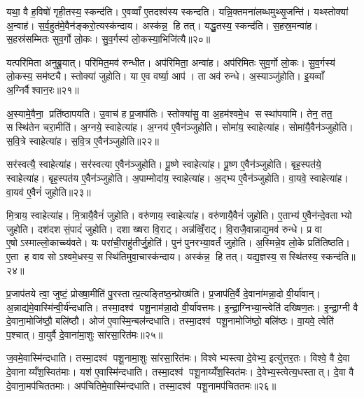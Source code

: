 यथा॒ वै ह॒विषो॑ गृही॒तस्य॒ स्कन्द॑ति। ए॒वव्वाँ ए॒तदश्व॑स्य स्कन्दति। यन्नि॒क्तमना॑लब्धमुथ्सृ॒जन्ति॑। यथ्स्तोक्या॑ अ॒न्वाह॑। स॒र्व॒हुत॑मे॒वैन॑ङ्करो॒त्यस्क॑न्दाय। अस्क॑न्न॒ हि तत्। यद्धु॒तस्य॒ स्कन्द॑ति। स॒हस्र॒मन्वा॑ह। स॒हस्र॑सम्मितः सुव॒र्गो लो॒कः। सु॒व॒र्गस्य॑ लो॒कस्या॒भिजि॑त्यै॥२०॥

यत्परि॑मिता अनुब्रू॒यात्। परि॑मित॒मव॑ रुन्धीत। अप॑रिमिता॒ अन्वा॑ह। अप॑रिमितः सुव॒र्गो लो॒कः। सु॒व॒र्गस्य॑ लो॒कस्य॒ सम॑ष्ट्यै। स्तोक्या॑ जुहोति। या ए॒व वर्ष्या॒ आप॑। ता अव॑ रुन्धे। अ॒स्याञ्जु॑होति। इ॒यव्वाँ अ॒ग्निर्वैश्वान॒रः॥२१॥

अ॒स्यामे॒वैना॒ प्रति॑ष्ठापयति। उ॒वाच॑ ह प्र॒जाप॑तिः। स्तोक्या॑सु॒ वा अ॒हम॑श्वमे॒ध सस्था॑पयामि। तेन॒ तत॒ सस्थि॑तेन चरा॒मीति॑। अ॒ग्नये॒ स्वाहेत्या॑ह। अ॒ग्नय॑ ए॒वैन॑ञ्जुहोति। सोमा॑य॒ स्वाहेत्या॑ह। सोमा॑यै॒वैन॑ञ्जुहोति। स॒वि॒त्रे स्वाहेत्या॑ह। स॒वि॒त्र ए॒वैन॑ञ्जुहोति॥२२॥

सर॑स्वत्यै॒ स्वाहेत्या॑ह। सर॑स्वत्या ए॒वैन॑ञ्जुहोति। पू॒ष्णे स्वाहेत्या॑ह। पू॒ष्ण ए॒वैन॑ञ्जुहोति। बृह॒स्पत॑ये॒ स्वाहेत्या॑ह। बृह॒स्पत॑य ए॒वैन॑ञ्जुहोति। अ॒पाम्मोदा॑य॒ स्वाहेत्या॑ह। अ॒द्भ्य ए॒वैन॑ञ्जुहोति। वा॒यवे॒ स्वाहेत्या॑ह। वा॒यव॑ ए॒वैनं॑ जुहोति॥२३॥

मि॒त्राय॒ स्वाहेत्या॑ह। मि॒त्रायै॒वैनं॑ जुहोति। वरु॑णाय॒ स्वाहेत्या॑ह। वरु॑णायै॒वैनं॑ जुहोति। ए॒ताभ्य॑ ए॒वैन॑न्दे॒वताभ्यो जुहोति। दश॑दश सं॒पादं॑ जुहोति। दशाख्षरा वि॒राट्। अन्न॑व्विँ॒राट्। वि॒राजै॒वान्नाद्य॒मव॑ रुन्धे। प्र वा ए॒षोऽस्माल्लो॒काच्च्य॑वते। यः परा॑ची॒राहु॑तीर्जु॒होति॑। पुन॑पुनरभ्या॒वर्तं॑ जुहोति। अ॒स्मिन्ने॒व लो॒के प्रति॑तिष्ठति। ए॒ता ह वाव सोऽश्वमे॒धस्य॒ सस्थि॑तिमुवा॒चास्क॑न्दाय। अस्क॑न्न॒ हि तत्। यद्य॒ज्ञस्य॒ सस्थि॑तस्य॒ स्कन्द॑ति॥२४॥\anuvakamend[अ॒भिजि॑त्यै वैश्वान॒रः स॑वि॒त्र ए॒वैनं॑ जुहोति वा॒यव॑ ए॒वैनं॑ जुहोति च्यवते॒ षट् च॑]

प्र॒जाप॑तये त्वा॒ जुष्टं॒ प्रोख्षा॒मीति॑ पु॒रस्तात्प्र॒त्यङ्तिष्ठ॒न्प्रोख्ष॑ति। प्र॒जाप॑ति॒र्वै दे॒वाना॑मन्ना॒दो वी॒र्या॑वान्। अ॒न्नाद्य॑मे॒वास्मि॑न्वी॒र्य॑न्दधाति। तस्मा॒दश्व॑ पशू॒नाम॑न्ना॒दो वी॒र्या॑वत्तमः। इ॒न्द्रा॒ग्निभ्या॒न्त्वेति॑ दख्षिण॒तः। इ॒न्द्रा॒ग्नी वै दे॒वाना॒मोजि॑ष्ठौ॒ बलि॑ष्ठौ। ओज॑ ए॒वास्मि॒न्बल॑न्दधाति। तस्मा॒दश्व॑ पशू॒नामोजि॑ष्ठो॒ बलि॑ष्ठः। वा॒यवे॒ त्वेति॑ प॒श्चात्। वा॒युर्वै दे॒वाना॑मा॒शुः सा॑रसा॒रित॑मः॥२५॥

ज॒वमे॒वास्मि॑न्दधाति। तस्मा॒दश्व॑ पशू॒नामा॒शुः सा॑रसा॒रित॑मः। विश्वेभ्यस्त्वा दे॒वेभ्य॒ इत्यु॑त्तर॒तः। विश्वे॒ वै दे॒वा दे॒वानाय्यँश॒स्वित॑माः। यश॑ ए॒वास्मि॑न्दधाति। तस्मा॒दश्व॑ पशू॒नाय्यँ॑श॒स्वित॑मः। दे॒वेभ्य॒स्त्वेत्य॒धस्तात्। दे॒वा वै दे॒वाना॒मप॑चिततमाः। अप॑चितिमे॒वास्मि॑न्दधाति। तस्मा॒दश्व॑ पशू॒नामप॑चिततमः॥२६॥


